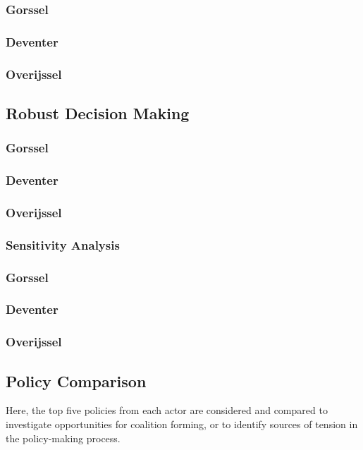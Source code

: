 \subsubsection{Gorssel}



\subsubsection{Deventer}
\subsubsection{Overijssel}

\subsection{Robust Decision Making}
\subsubsection{Gorssel}
\subsubsection{Deventer}
\subsubsection{Overijssel}

\subsubsection{Sensitivity Analysis}

\subsubsection{Gorssel}
\subsubsection{Deventer}
\subsubsection{Overijssel}


\subsection{Policy Comparison}
Here, the top five policies from each actor are considered and compared to investigate opportunities for coalition forming, or to identify sources of tension in the policy-making process.